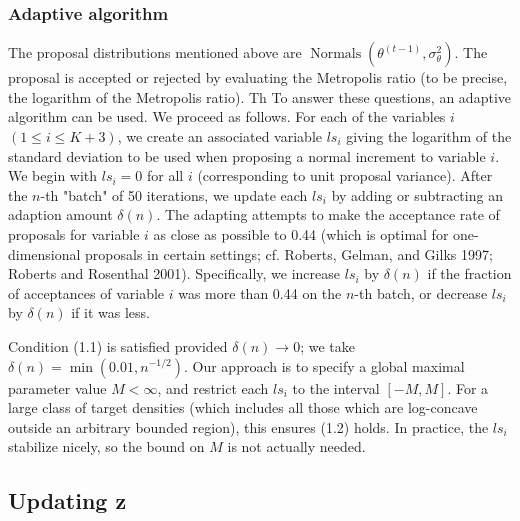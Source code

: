\documentclass[11pt]{amsart}
\begin{document}
\subsubsection{Adaptive algorithm}
The proposal distributions mentioned above are $\operatorname{Normals}\left( \theta^{(t-1)}, \sigma_{\theta}^2 \right)$. The proposal is accepted or rejected by evaluating the Metropolis ratio (to be precise, the logarithm of the Metropolis ratio). Th
To answer these questions, an adaptive algorithm can be used. We proceed as follows. For each of the variables \(i\) \((1 \leq i \leq K + 3)\), we create an associated variable \(ls_i\) giving the logarithm of the standard deviation to be used when proposing a normal increment to variable \(i\). We begin with \(ls_i = 0\) for all \(i\) (corresponding to unit proposal variance). After the \(n\)-th "batch" of 50 iterations, we update each \(ls_i\) by adding or subtracting an adaption amount \(\delta(n)\). The adapting attempts to make the acceptance rate of proposals for variable \(i\) as close as possible to 0.44 (which is optimal for one-dimensional proposals in certain settings; cf. Roberts, Gelman, and Gilks 1997; Roberts and Rosenthal 2001). Specifically, we increase \(ls_i\) by \(\delta(n)\) if the fraction of acceptances of variable \(i\) was more than 0.44 on the \(n\)-th batch, or decrease \(ls_i\) by \(\delta(n)\) if it was less.

Condition (1.1) is satisfied provided \(\delta(n) \rightarrow 0\); we take \(\delta(n) = \min(0.01, n^{-1/2})\). Our approach is to specify a global maximal parameter value \(M < \infty\), and restrict each \(ls_i\) to the interval \([-M, M]\). For a large class of target densities (which includes all those which are log-concave outside an arbitrary bounded region), this ensures (1.2) holds. In practice, the \(ls_i\) stabilize nicely, so the bound on \(M\) is not actually needed.

\subsection{Updating z}
\end{document}
